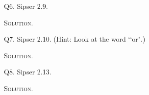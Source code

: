 \newpage
Q6. Sipser 2.9.

\textsc{Solution}.


\newpage
Q7. Sipser 2.10. (Hint: Look at the word \lq\lq or".)

\textsc{Solution}.



\newpage
Q8. Sipser 2.13.

\textsc{Solution}.




